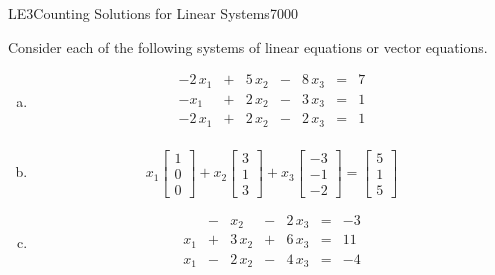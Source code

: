 \begin{exercise}{LE3}{Counting Solutions for Linear Systems}{7000} 
\begin{exerciseStatement} 

 Consider each of the following systems of linear equations or vector equations. 

 

\begin{enumerate}[(a)]
\item  

 \[
              \begin{matrix}
 -2 \, x_{1} &  +  & 5 \, x_{2} &  -  & 8 \, x_{3} & = & 7 \\
 -x_{1} &  +  & 2 \, x_{2} &  -  & 3 \, x_{3} & = & 1 \\
 -2 \, x_{1} &  +  & 2 \, x_{2} &  -  & 2 \, x_{3} & = & 1 \\
 \end{matrix}
            \] 

 
\item  

 \[
              x_{1} \left[\begin{array}{c}
1 \\
0 \\
0
\end{array}\right] + x_{2} \left[\begin{array}{c}
3 \\
1 \\
3
\end{array}\right] + x_{3} \left[\begin{array}{c}
-3 \\
-1 \\
-2
\end{array}\right] = \left[\begin{array}{c}
5 \\
1 \\
5
\end{array}\right]
            \] 

 
\item  

 \[
              \begin{matrix}
 &  -  & x_{2} &  -  & 2 \, x_{3} & = & -3 \\
 x_{1} &  +  & 3 \, x_{2} &  +  & 6 \, x_{3} & = & 11 \\
 x_{1} &  -  & 2 \, x_{2} &  -  & 4 \, x_{3} & = & -4 \\
 \end{matrix}
            \] 


\end{enumerate}
\end{exerciseStatement}
\end{exercise}
